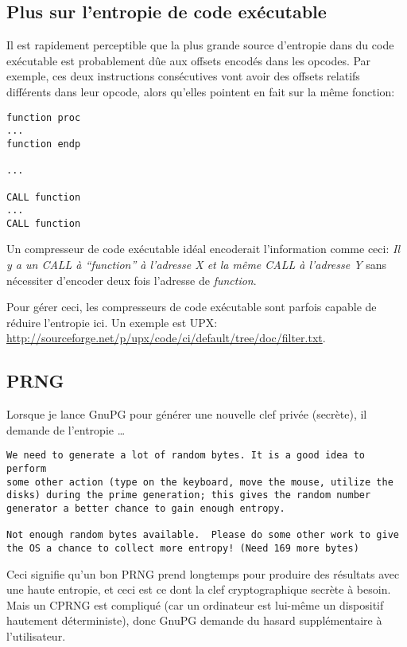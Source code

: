 \subsection{Plus sur l'entropie de code exécutable}

Il est rapidement perceptible que la plus grande source d'entropie dans du code
exécutable est probablement dûe aux offsets encodés dans les opcodes.
Par exemple, ces deux instructions consécutives vont avoir des offsets relatifs
différents dans leur opcode, alors qu'elles pointent en fait sur la même fonction:

\begin{lstlisting}[style=customasmx86]
function proc
...
function endp

...

CALL function
...
CALL function
\end{lstlisting}

Un compresseur de code exécutable idéal encoderait l'information comme ceci:
\emph{Il y a un CALL à ``function'' à l'adresse X et la même CALL à l'adresse Y}
sans nécessiter d'encoder deux fois l'adresse de \emph{function}.

Pour gérer ceci, les compresseurs de code exécutable sont parfois capable de réduire
l'entropie ici.
Un exemple est UPX: \url{http://sourceforge.net/p/upx/code/ci/default/tree/doc/filter.txt}.

\subsection{\ac{PRNG}}

Lorsque je lance GnuPG pour générer une nouvelle clef privée (secrète), il demande
de l'entropie \dots

\begin{lstlisting}
We need to generate a lot of random bytes. It is a good idea to perform
some other action (type on the keyboard, move the mouse, utilize the
disks) during the prime generation; this gives the random number
generator a better chance to gain enough entropy.

Not enough random bytes available.  Please do some other work to give
the OS a chance to collect more entropy! (Need 169 more bytes)
\end{lstlisting}

Ceci signifie qu'un bon \ac{PRNG} prend longtemps pour produire des résultats avec
une haute entropie, et ceci est ce dont la clef cryptographique secrète à besoin.
Mais un \ac{CPRNG} est compliqué (car un ordinateur est lui-même un dispositif
hautement déterministe), donc GnuPG demande du hasard supplémentaire à l'utilisateur.

